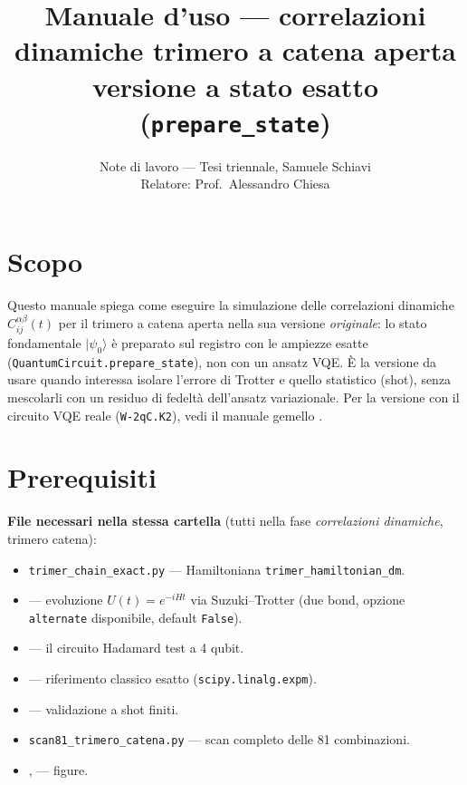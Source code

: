 \documentclass[11pt,a4paper]{article}
\title{Manuale d'uso --- correlazioni dinamiche trimero a catena aperta\\
\large versione a stato esatto (\texttt{prepare\_state})}
\author{Note di lavoro --- Tesi triennale, Samuele Schiavi\\ Relatore: Prof.\ Alessandro Chiesa}
\date{}
\newcommand{\ket}[1]{\lvert #1 \rangle}
\begin{document}
\maketitle

\section*{Scopo}

Questo manuale spiega come eseguire la simulazione delle correlazioni dinamiche
$C_{ij}^{\alpha\beta}(t)$ per il trimero a catena aperta nella sua versione
\emph{originale}: lo stato fondamentale $\ket{\psi_0}$ è preparato sul registro
con le ampiezze esatte (\texttt{QuantumCircuit.prepare\_state}), non con un
ansatz VQE. È la versione da usare quando interessa isolare l'errore di
Trotter e quello statistico (shot), senza mescolarli con un residuo di
fedeltà dell'ansatz variazionale. Per la versione con il circuito VQE reale
(\texttt{W-2qC.K2}), vedi il manuale gemello
\texttt{}.

\section*{Prerequisiti}

\textbf{File necessari nella stessa cartella} (tutti nella fase
\emph{correlazioni dinamiche}, trimero catena):
\begin{itemize}
\item \texttt{trimer\_chain\_exact.py} --- Hamiltoniana \texttt{trimer\_hamiltonian\_dm}.
\item \texttt{} --- evoluzione $U(t)=e^{-iHt}$ via
Suzuki--Trotter (due bond, opzione \texttt{alternate} disponibile, default \texttt{False}).
\item \texttt{} --- il circuito Hadamard test a 4 qubit.
\item \texttt{} --- riferimento classico esatto (\texttt{scipy.linalg.expm}).
\item \texttt{} --- validazione a shot finiti.
\item \texttt{scan81\_trimero\_catena.py} --- scan completo delle 81 combinazioni.
\item \texttt{}, \texttt{} --- figure.
\end{itemize}
\end{document}
